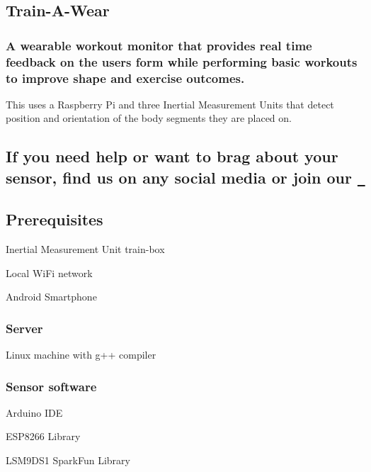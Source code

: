 

\subsection*{Train-\/\+A-\/\+Wear}

\subsubsection*{A wearable workout monitor that provides real time feedback on the user\textquotesingle{}s form while performing basic workouts to improve shape and exercise outcomes.}

This uses a Raspberry Pi and three Inertial Measurement Units that detect position and orientation of the body segments they are placed on.

\subsection*{If you need help or want to brag about your sensor, find us on any social media or join our \href{https://gitter.im/train-A-wear/community?utm_source=badge&utm_medium=badge&utm_campaign=pr-badge}{\texttt{ }}}

\subsection*{Prerequisites}


\begin{DoxyItemize}
\item Inertial Measurement Unit train-\/box
\item Local Wi\+Fi network
\item Android Smartphone
\end{DoxyItemize}

\subsubsection*{Server}


\begin{DoxyItemize}
\item Linux machine with g++ compiler
\end{DoxyItemize}

\subsubsection*{Sensor software}


\begin{DoxyItemize}
\item Arduino I\+DE
\item E\+S\+P8266 Library
\item L\+S\+M9\+D\+S1 Spark\+Fun Library
\end{DoxyItemize}

